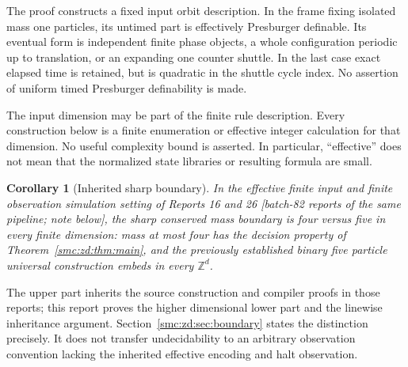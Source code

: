 \documentclass[11pt,letterpaper]{article}
\numberwithin{equation}{section}
\newtheorem{corollary}[theorem]{Corollary}
\theoremstyle{definition}
\theoremstyle{remark}
\newcommand{\Z}{\mathbb Z}
\begin{document}
The proof constructs a fixed input orbit description. In the frame fixing isolated mass one particles, its untimed part is effectively Presburger definable. Its eventual form is independent finite phase objects, a whole configuration periodic up to translation, or an expanding one counter shuttle. In the last case exact elapsed time is retained, but is quadratic in the shuttle cycle index. No assertion of uniform timed Presburger definability is made.

The input dimension may be part of the finite rule description. Every construction below is a finite enumeration or effective integer calculation for that dimension. No useful complexity bound is asserted. In particular, ``effective'' does not mean that the normalized state libraries or resulting formula are small.

\begin{corollary}[Inherited sharp boundary]\label{smc:zd:cor:boundary}
In the effective finite input and finite observation simulation setting of Reports 16 and 26 \textup{[batch-82 reports of the same pipeline; note below]}, the sharp conserved mass boundary is four versus five in every finite dimension: mass at most four has the decision property of Theorem~\ref{smc:zd:thm:main}, and the previously established binary five particle universal construction embeds in every $\Z^d$.
\end{corollary}
The upper part inherits the source construction and compiler proofs in those reports; this report proves the higher dimensional lower part and the linewise inheritance argument. Section~\ref{smc:zd:sec:boundary} states the distinction precisely. It does not transfer undecidability to an arbitrary observation convention lacking the inherited effective encoding and halt observation.
\end{document}
